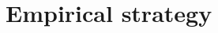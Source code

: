 \documentclass[12pt,a4paper]{article}
\begin{document}







\section{Empirical strategy}
\end{document}
